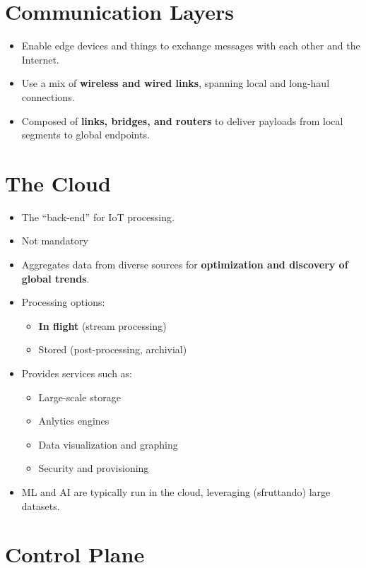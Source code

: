 \section{Communication Layers}

\begin{itemize}
    \item Enable edge devices and things to exchange messages with each other and the Internet.
    
    \item Use a mix of \textbf{wireless and wired links}, spanning local and long-haul connections.
    
    \item Composed of \textbf{links, bridges, and routers} to deliver payloads from local segments to global endpoints.
\end{itemize}

\section{The Cloud}
\begin{itemize}
    \item The ``back-end'' for IoT processing.
    \item Not mandatory
    \item Aggregates data from diverse sources for \textbf{optimization and discovery of global trends}.
    \item Processing options:
    \begin{itemize}
        \item \textbf{In flight} (stream processing)
        \item Stored (post-processing, archivial)
    \end{itemize}
    \item Provides services such as:
    \begin{itemize}
        \item Large-scale storage
        \item Anlytics engines
        \item Data visualization and graphing
        \item Security and provisioning
    \end{itemize}
    \item ML and AI are typically run in the cloud, leveraging (sfruttando) large datasets.
\end{itemize}

\section{Control Plane}

